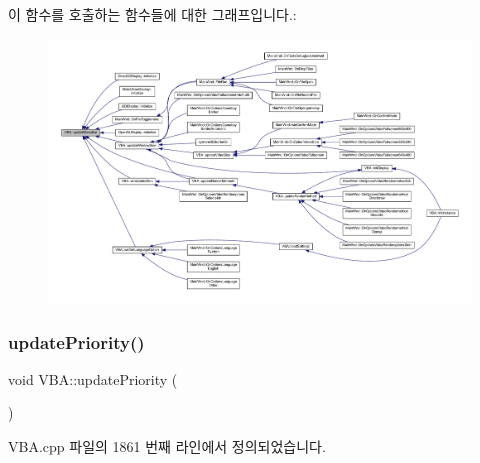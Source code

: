 이 함수를 호출하는 함수들에 대한 그래프입니다.\+:
\nopagebreak
\begin{figure}[H]
\begin{center}
\leavevmode
\includegraphics[width=350pt]{class_v_b_a_accf3451bad473b90400193636cd27c96_icgraph}
\end{center}
\end{figure}
\mbox{\label{class_v_b_a_a82623f5ce8199b90e3a68fe8c8fee853}} 
\subsubsection{\texorpdfstring{update\+Priority()}{updatePriority()}}
{\footnotesize\ttfamily void V\+B\+A\+::update\+Priority (\begin{DoxyParamCaption}{ }\end{DoxyParamCaption})}



V\+B\+A.\+cpp 파일의 1861 번째 라인에서 정의되었습니다.


